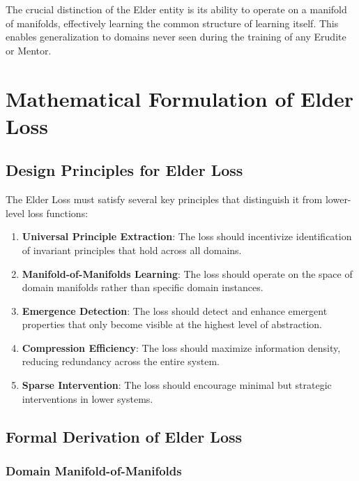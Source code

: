 The crucial distinction of the Elder entity is its ability to operate on a manifold of manifolds, effectively learning the common structure of learning itself. This enables generalization to domains never seen during the training of any Erudite or Mentor.

\section{Mathematical Formulation of Elder Loss}

\subsection{Design Principles for Elder Loss}

The Elder Loss must satisfy several key principles that distinguish it from lower-level loss functions:

\begin{enumerate}
\item \textbf{Universal Principle Extraction}: The loss should incentivize identification of invariant principles that hold across all domains.

\item \textbf{Manifold-of-Manifolds Learning}: The loss should operate on the space of domain manifolds rather than specific domain instances.

\item \textbf{Emergence Detection}: The loss should detect and enhance emergent properties that only become visible at the highest level of abstraction.

\item \textbf{Compression Efficiency}: The loss should maximize information density, reducing redundancy across the entire system.

\item \textbf{Sparse Intervention}: The loss should encourage minimal but strategic interventions in lower systems.
\end{enumerate}

\subsection{Formal Derivation of Elder Loss}

\subsubsection{Domain Manifold-of-Manifolds}

